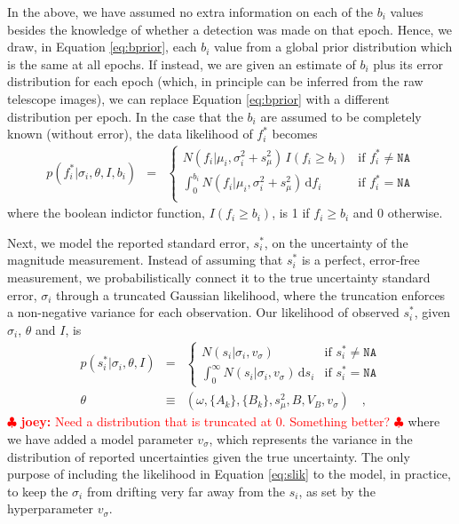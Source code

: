\documentclass[12pt,preprint]{aastex}
\newcommand{\dd}{\mathrm{d}}
\newcommand{\fobs}{f_i^*}
\newcommand{\sobs}{s_i^*}
\newcommand{\joey}[1] { \textcolor{red} {
\ensuremath{\clubsuit} {\bf joey:}  {#1}
\ensuremath{\clubsuit} } }%
\begin{document}
In the above, we have assumed no extra information on each of the $b_i$ values besides the knowledge of whether a detection was made on that epoch.  Hence, we draw, in Equation \ref{eq:bprior}, each $b_i$ value from a global prior distribution which is the same at all epochs.  If instead, we are given an estimate of $b_i$ plus its error distribution for each epoch (which, in principle can be inferred from the raw telescope images), we can replace Equation \ref{eq:bprior} with a different distribution per epoch.  In the case that the $b_i$ are assumed to be completely known (without error), the data likelihood of $\fobs$ becomes
\begin{eqnarray}\displaystyle
p(\fobs |\sigma_i,\theta,I, b_i) &=& \left\{\begin{array}{ll}
  N(f_i | \mu_i,  \sigma_i^2 + s_{\mu}^2)\,  I(f_i \ge b_i) & \mbox{if $\fobs \ne \texttt{NA}$} \\
 \int_{0}^{b_i} N(f_i | \mu_i, \sigma_i^2 + s_{\mu}^2)\, \dd f_i & \mbox{if $\fobs = \texttt{NA}$} \\
\end{array}\right.\label{eq:mlik_s}
\end{eqnarray}
where the boolean indictor function, $I(f_i \ge b_i)$, is 1 if $f_i \ge b_i$ and 0 otherwise.

Next, we model the reported standard error, $\sobs$, on the uncertainty of the magnitude measurement.  Instead of assuming that $\sobs$ is a perfect, error-free measurement, we probabilistically connect it to the true uncertainty standard error, $\sigma_i$ through a truncated Gaussian likelihood, where the truncation enforces a non-negative variance for each observation.  Our likelihood of observed $\sobs$, given $\sigma_i$, $\theta$ and $I$, is
\begin{eqnarray}\displaystyle
p(\sobs | \sigma_i, \theta,I) &=& \left\{\begin{array}{ll}
  N(s_i|\sigma_i,v_\sigma) & \mbox{if $\sobs \ne \texttt{NA}$} \\
  \int_{0}^{\infty}  N(s_i | \sigma_i,v_\sigma)\,  \dd s_i & \mbox{if $\sobs = \texttt{NA}$}
\end{array}\right.\label{eq:slik}
\\
\theta &\equiv& (\omega, \{A_k\}, \{B_k\}, s_\mu^2, B, V_B ,v_\sigma) \quad ,
\end{eqnarray}
\joey{Need a distribution that is truncated at 0. Something better? }
where we have added a model parameter $v_\sigma$, which represents the
variance in the distribution of reported uncertainties given the true
uncertainty.  The only purpose of 
 including the likelihood in Equation \ref{eq:slik} to the model, in practice, to keep the $\sigma_i$ from
drifting very far away from the $s_i$, as set by the hyperparameter
$v_\sigma$.
\end{document}
